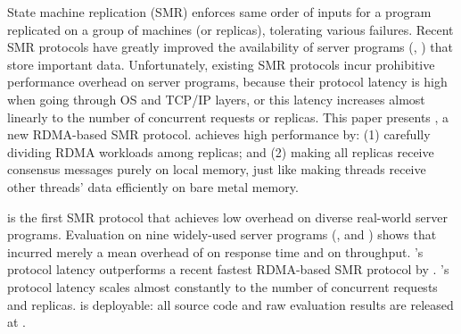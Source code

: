 State machine replication (SMR) enforces same order of inputs 
for a program replicated on a group of machines (or replicas), 
tolerating various failures. Recent SMR protocols have greatly improved
the availability of server programs (\eg, \redis) that store important data. 
Unfortunately, existing SMR protocols incur prohibitive performance overhead on 
server programs, because their protocol latency is high when going through OS 
and TCP/IP layers, or this latency increases almost linearly to the number of 
concurrent requests or replicas. This paper presents \xxx, a new 
RDMA-based SMR protocol. \xxx achieves high performance by: (1) carefully 
dividing RDMA workloads among replicas; and (2) making all replicas receive 
consensus messages purely on local memory, just like making threads receive 
other threads' data efficiently on bare metal memory.


\xxx is the first SMR protocol that achieves low overhead on diverse 
real-world server programs. Evaluation on nine widely-used server programs (\eg, 
\redis and \mysql) shows that \xxx incurred merely a mean overhead of 
\latencyoverhead on response time and \tputoverhead on throughput.
\xxx's protocol latency outperforms a recent fastest RDMA-based SMR protocol 
by \fasterDARE. \xxx's protocol latency scales almost constantly to the number 
of concurrent requests and replicas. \xxx is deployable: all source code and 
raw evaluation results are released at \github.



